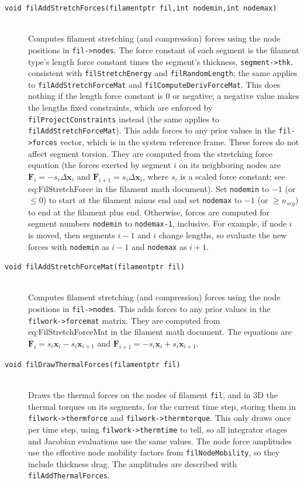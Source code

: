 \documentclass {scrbook}
\newcommand {\ttt} {\texttt}
\begin{document}
\begin{description}
\item[\ttt{void filAddStretchForces(filamentptr fil,int nodemin,int nodemax)}]
\hfill \\
Computes filament stretching (and compression) forces using the node positions in \ttt{fil->nodes}. The force constant of each segment is the filament type's length force constant times the segment's thickness, \ttt{segment->thk}, consistent with \ttt{filStretchEnergy} and \ttt{filRandomLength}; the same applies to \ttt{filAddStretchForceMat} and \ttt{filComputeDerivForceMat}. This does nothing if the length force constant is 0 or negative; a negative value makes the lengths fixed constraints, which are enforced by \ttt{filProjectConstraints} instead (the same applies to \ttt{filAddStretchForceMat}). This adds forces to any prior values in the \ttt{fil->forces} vector, which is in the system reference frame. These forces do not affect segment torsion. They are computed from the stretching force equation (the forces exerted by segment $i$ on its neighboring nodes are $\bm{F}_{i} = - s_i \Delta \bm{x}_i$ and
$\bm{F}_{i+1} = s_i \Delta \bm{x}_i$, where $s_i$ is a scaled force constant; see eq:FilStretchForce in the filament math document). Set \ttt{nodemin} to $-1$ (or $\leq 0$) to start at the filament minus end and set \ttt{nodemax} to $-1$ (or $\geq n_{seg}$) to end at the filament plus end. Otherwise, forces are computed for segment numbers \ttt{nodemin} to \ttt{nodemax-1}, inclusive. For example, if node $i$ is moved, then segments $i-1$ and $i$ change lengths, so evaluate the new forces with \ttt{nodemin} as $i-1$ and \ttt{nodemax} as $i+1$.

\item[\ttt{void filAddStretchForceMat(filamentptr fil)}]
\hfill \\
Computes filament stretching (and compression) forces using the node positions in \ttt{fil->nodes}. This adds forces to any prior values in the \ttt{filwork->forcemat} matrix. They are computed from eq:FilStretchForceMat in the filament math document. The equations are $\bm{F}_{i} = s_i \bm{x}_i - s_i \bm{x}_{i+1}$ and $\bm{F}_{i+1} = - s_i \bm{x}_i + s_i \bm{x}_{i+1}$.


\item[\ttt{void filDrawThermalForces(filamentptr fil)}] %
\hfill \\
Draws the thermal forces on the nodes of filament \ttt{fil}, and in 3D the thermal torques on its segments, for the current time step, storing them in \ttt{filwork->thermforce} and \ttt{filwork->thermtorque}. This only draws once per time step, using \ttt{filwork->thermtime} to tell, so all integrator stages and Jacobian evaluations use the same values. The node force amplitudes use the effective node mobility factors from \ttt{filNodeMobility}, so they include thickness drag. The amplitudes are described with \ttt{filAddThermalForces}.


\end{description}
\end{document}
